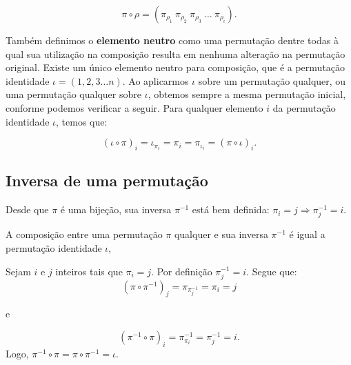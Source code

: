 \[\pi \circ \rho = (\pi_{\rho_1} \ \pi_{\rho_2} \ \pi_{\rho_3} \ \ldots \ \pi_{\rho_i}).\]


Também definimos o \textbf{elemento neutro} como uma permutação dentre todas à qual sua utilização na composição resulta em nenhuma alteração na permutação original. Existe um único elemento neutro para composição, que é a permutação identidade $\iota = (1, 2, 3 \ldots n)$. Ao aplicarmos $\iota$ sobre um permutação qualquer, ou uma permutação qualquer sobre $\iota$, obtemos sempre a mesma permutação inicial, conforme podemos verificar a seguir. Para qualquer elemento $i$ da permutação identidade $\iota$, temos que: 
    
    \[(\iota \circ \pi)_i = \iota_{\pi_i} = \pi_i 
    = \pi_{\iota_i} = (\pi \circ \iota)_i. \]

\subsection{Inversa de uma permutação}


Desde que $\pi$ é uma bijeção, sua inversa $\pi^{-1}$ está bem definida: $\pi_i = j \Rightarrow \pi^{-1}_j = i$. 

\begin{prop}
A composição entre uma permutação $\pi$ qualquer e sua inversa $\pi^{-1}$ é igual a permutação identidade $\iota$,

\end{prop}
\begin{prova}
Sejam $i$ e $j$ inteiros tais que $\pi_i = j$. Por definição $\pi^{-1}_j = i$. Segue que:
\[(\pi \circ \pi^{-1})_j = \pi_{\pi^{-1}_j} = \pi_i = j\] 
\begin{center} e \end{center}
\[(\pi^{-1} \circ \pi)_i = \pi^{-1}_{\pi_i} = \pi^{-1}_j = i.\]
Logo, $\pi^{-1} \circ \pi = \pi \circ \pi^{-1} = \iota$.
\end{prova}


